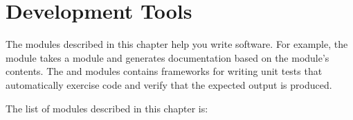 \chapter{Development Tools}
\label{development}

The modules described in this chapter help you write software.  For
example, the  module takes a module and generates
documentation based on the module's contents.  The 
and  modules contains frameworks for writing unit tests
that automatically exercise code and verify that the expected output 
is produced.

The list of modules described in this chapter is:

\localmoduletable
